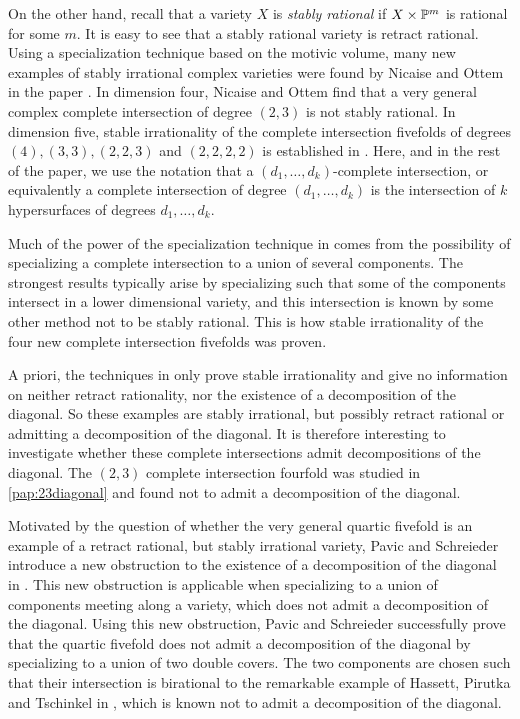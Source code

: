 On the other hand, recall that a variety $X$ is \emph{stably rational} if $X \times \P^m$ is rational for some $m$. It is easy to see that a stably rational variety is retract rational. Using a specialization technique based on the motivic volume, many new examples of stably irrational complex varieties were found by Nicaise and Ottem in the paper \cite{NicaiseOttem}. In dimension four, Nicaise and Ottem find that a very general complex complete intersection of degree $(2,3)$ is not stably rational. In dimension five, stable irrationality of the complete intersection fivefolds of degrees $(4), (3,3), (2,2,3)$ and $(2,2,2,2)$ is established in \cite{NicaiseOttem}. Here, and in the rest of the paper, we use the notation that a $(d_1,\dots,d_k)$-complete intersection, or equivalently a complete intersection of degree $(d_1,\dots,d_k)$ is the intersection of $k$ hypersurfaces of degrees $d_1,\dots,d_k$.

Much of the power of the specialization technique in \cite{NicaiseOttem} comes from the possibility of specializing a complete intersection to a union of several components. The strongest results typically arise by specializing such that some of the components intersect in a lower dimensional variety, and this intersection is known by some other method not to be stably rational. This is how stable irrationality of the four new complete intersection fivefolds was proven.

A priori, the techniques in \cite{NicaiseOttem} only prove stable irrationality and give no information on neither retract rationality, nor the existence of a decomposition of the diagonal. So these examples are stably irrational, but possibly retract rational or admitting a decomposition of the diagonal. It is therefore interesting to investigate whether these complete intersections admit decompositions of the diagonal. The $(2,3)$ complete intersection fourfold was studied in \cref{pap:23diagonal} and found not to admit a decomposition of the diagonal.

Motivated by the question of whether the very general quartic fivefold is an example of a retract rational, but stably irrational variety, Pavic and Schreieder introduce a new obstruction to the existence of a decomposition of the diagonal in \cite{PavicSchreieder}. This new obstruction is applicable when specializing to a union of components meeting along a variety, which does not admit a decomposition of the diagonal. Using this new obstruction, Pavic and Schreieder successfully prove that the quartic fivefold does not admit a decomposition of the diagonal by specializing to a union of two double covers. The two components are chosen such that their intersection is birational to the remarkable example of Hassett, Pirutka and Tschinkel in \cite{HPTActa}, which is known not to admit a decomposition of the diagonal.

